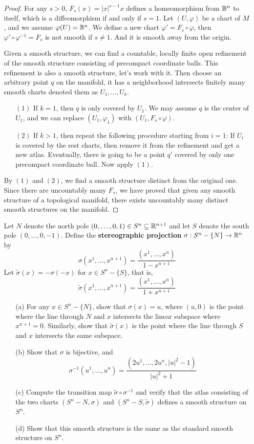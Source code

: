\begin{proof}
For any $s>0$, $F_s(x)=|x|^{s-1}x$ defines a homeomorphism from $\mathbb{B}^n$ to itself, which is a diffeomorphism if and only if $s=1$. Let $(U,\varphi)$ be a chart of $M$, and we assume $\varphi(U)=\mathbb{B}^n$. We define a new chart $\varphi'=F_s\circ\varphi$, then $\varphi'\circ\varphi^{-1}=F_s$ is not smooth if $s\neq 1$. And it is smooth away from the origin.\par
Given a smooth structure, we can find a countable, locally finite open refinement of the smooth structure consisting of precompact coordinate balls. This refinement is also a smooth structure, let's work with it. Then choose an arbitrary point $q$ on the manifold, it has a neighborhood intersects finitely many smooth charts denoted them as $U_1,\dots,U_k$.
\begin{itemize}
\item[$(1)$] If $k=1$, then $q$ is only covered by $U_1$. We may assume $q$ is the center of $U_1$, and we can replace $(U_1,\varphi_1)$ with $(U_1,F_s\circ\varphi)$.
\item[$(2)$] If $k>1$, then repeat the following procedure starting from $i=1$: If $U_i$ is covered by the rest charts, then remove it from the refinement and get a new atlas. Eventually, there is going to be a point $q'$ covered by only one precompact coordinate ball. Now apply $(1)$.
\end{itemize}
By $(1)$ and $(2)$, we find a smooth structure distinct from the original one. Since there are uncountably many $F_s$, we have proved that given any smooth structure of a topological manifold, there exists uncountably many distinct smooth structures on the manifold.
\end{proof}
\begin{exercise}
Let $N$ denote the north pole $(0,\dots,0,1)\in S^n\subseteq\mathbb{R}^{n+1}$ and let $S$ denote
the south pole $(0,\dots,0,-1)$. Define the \textbf{stereographic projection} $\sigma:S^n-\{N\}\to\mathbb{R}^n$ by
\[\sigma(x^1,\dots,x^{n+1})=\frac{(x^1,\dots,x^n)}{1-x^{n+1}}\]
Let $\tilde{\sigma}(x)=-\sigma(-x)$ for $x\in S^n-\{S\}$, that is,
\[\tilde{\sigma}(x^1,\dots,x^{n+1})=\frac{(x^1,\dots,x^n)}{1+x^{n+1}}\]
\begin{itemize}
\item[(a)]For any $x\in S^n-\{N\}$, show that $\sigma(x)=u$, where $(u,0)$ is the point where the line through $N$ and $x$ intersects the linear subspace where $x^{n+1}=0$. Similarly, show that $\tilde{\sigma}(x)$ is the point where the
line through $S$ and $x$ intersects the same subspace. 
\item[(b)]Show that $\sigma$ is bijective, and
\[\sigma^{-1}(u^1,\dots,u^n)=\frac{(2u^1,\dots,2u^n,|u|^2-1)}{|u|^2+1}\]
\item[(c)]Compute the transition map $\tilde{\sigma}\circ\sigma^{-1}$ and verify that the atlas consisting of the two charts $(S^n-N,\sigma)$ and $(S^n-S,\tilde{\sigma})$ defines a smooth structure on $S^n$.
\item[(d)]Show that this smooth structure is the same as the standard smooth structure on $S^n$.
\end{itemize}
\end{exercise}
